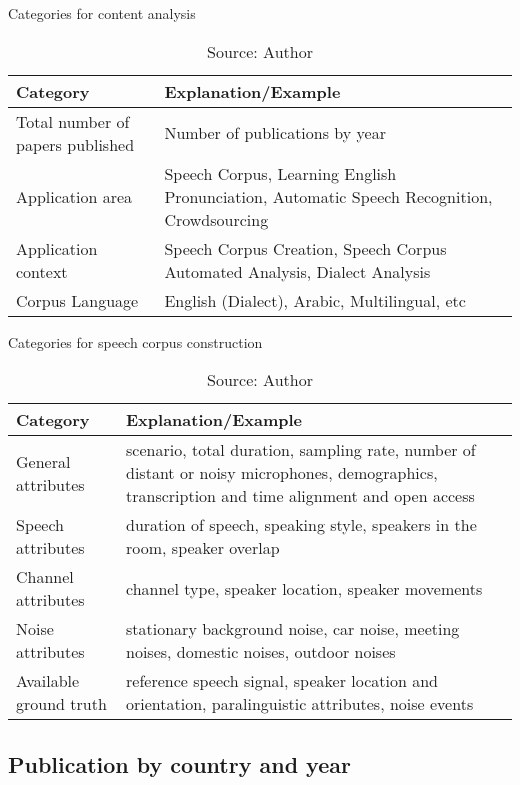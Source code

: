 \begin{table}[h]
    \centering
    \caption{Categories for content analysis}
    \begin{tabular}{|p{4cm}|p{11cm}|}
        \hline Category & Explanation/Example \\ \hline
        Total number of papers published & Number of publications by year \\ \hline
        Application area & Speech Corpus, Learning English Pronunciation, Automatic Speech Recognition, Crowdsourcing \\ \hline
        Application context & Speech Corpus Creation, Speech Corpus Automated Analysis, Dialect Analysis \\ \hline
        Corpus Language & English (Dialect), Arabic, Multilingual, etc \\ \hline
    \end{tabular}
    \caption*{Source: Author}
    \label{tab:content-analysis}
\end{table}

\begin{table}[h]
    \centering
    \caption{Categories for speech corpus construction}
    \begin{tabular}{|p{4cm}|p{11cm}|}
        \hline Category & Explanation/Example \\ \hline
        General attributes & scenario, total duration, sampling rate, number of distant or noisy microphones, demographics, transcription and time alignment and open access \\ \hline
        Speech attributes & duration of speech, speaking style, speakers in the room, speaker overlap\\ \hline
        Channel attributes & channel type, speaker location, speaker movements \\ \hline
        Noise attributes & stationary background noise, car noise, meeting noises, domestic noises, outdoor noises \\ \hline
        Available ground truth & reference speech signal, speaker location and orientation, paralinguistic attributes, noise events \\ \hline
    \end{tabular}
    \caption*{Source: Author}
    \label{tab:speech-analysis}
\end{table}

\subsection{Publication by country and year}


